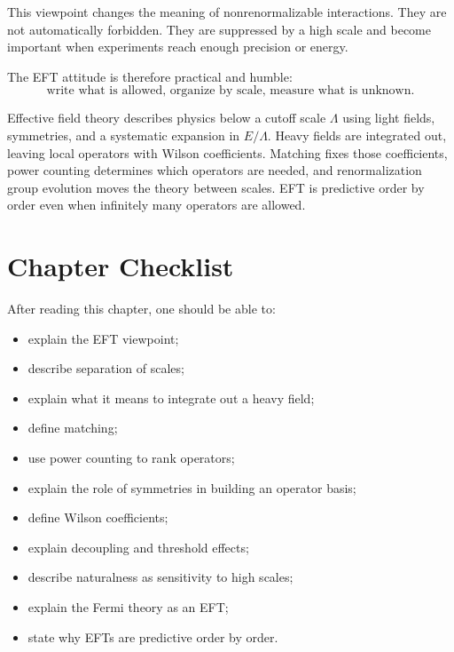 This viewpoint changes the meaning of nonrenormalizable interactions. They are
not automatically forbidden. They are suppressed by a high scale and become
important when experiments reach enough precision or energy.

The EFT attitude is therefore practical and humble:
\[
    \text{write what is allowed, organize by scale, measure what is unknown}.
\]

\begin{summarybox}
Effective field theory describes physics below a cutoff scale \(\Lambda\) using
light fields, symmetries, and a systematic expansion in \(E/\Lambda\). Heavy
fields are integrated out, leaving local operators with Wilson coefficients.
Matching fixes those coefficients, power counting determines which operators are
needed, and renormalization group evolution moves the theory between scales. EFT
is predictive order by order even when infinitely many operators are allowed.
\end{summarybox}

\section{Chapter Checklist}

After reading this chapter, one should be able to:
\begin{itemize}
    \item explain the EFT viewpoint;
    \item describe separation of scales;
    \item explain what it means to integrate out a heavy field;
    \item define matching;
    \item use power counting to rank operators;
    \item explain the role of symmetries in building an operator basis;
    \item define Wilson coefficients;
    \item explain decoupling and threshold effects;
    \item describe naturalness as sensitivity to high scales;
    \item explain the Fermi theory as an EFT;
    \item state why EFTs are predictive order by order.
\end{itemize}
